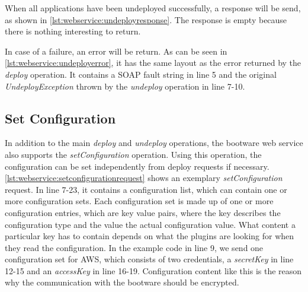 \vspace*{\baselineskip}

\vspace*{-1.0cm}

When all applications have been undeployed successfully, a response will be send, as shown in \autoref{lst:webservice:undeployresponse}.
The response is empty because there is nothing interesting to return.

\vspace*{\baselineskip}

In case of a failure, an error will be return.
As can be seen in \autoref{lst:webservice:undeployerror}, it has the same layout as the error returned by the \textit{deploy} operation.
It contains a SOAP fault string in line 5 and the original \textit{UndeployException} thrown by the \textit{undeploy} operation in line 7-10.

\subsection{Set Configuration}

In addition to the main \textit{deploy} and \textit{undeploy} operations, the bootware web service also supports the \textit{setConfiguration} operation.
Using this operation, the configuration can be set independently from deploy requests if necessary.
\autoref{lst:webservice:setconfigurationrequest} shows an exemplary \textit{setConfiguration} request.
In line 7-23, it contains a configuration list, which can contain one or more configuration sets.
Each configuration set is made up of one or more configuration entries, which are key value pairs, where the key describes the configuration type and the value the actual configuration value.
What content a particular key has to contain depends on what the plugins are looking for when they read the configuration.
In the example code in line 9, we send one configuration set for AWS, which consists of two credentials, a \textit{secretKey} in line 12-15 and an \textit{accessKey} in line 16-19.
Configuration content like this is the reason why the communication with the bootware should be encrypted.


